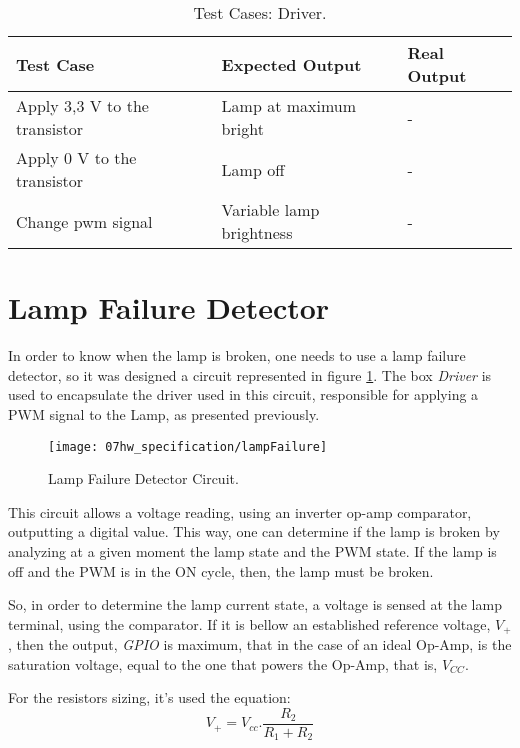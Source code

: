 \begin{table}[H]
	\centering
	\resizebox{\columnwidth}{!}
	{
		\begin{tabular}{|m{3cm}|m{5cm}||m{5cm}|}
			\hline
			\textbf{Test Case} & \textbf{Expected Output} & \textbf{Real Output}
			\\\hline\hline
			Apply 3,3 V to the transistor & Lamp at maximum bright & -
			\\\hline
			Apply 0 V to the transistor & Lamp off & -
			\\\hline
			Change \ac{pwm} signal & Variable lamp brightness & -
			\\\hline
		\end{tabular}
	}
	\caption{Test Cases: Driver.}
	\label{table:test_driver}
\end{table}

\section{Lamp Failure Detector}
In order to know when the lamp is broken, one needs to use a lamp failure detector, so it was designed a circuit represented in figure \ref{fig:lampFailure}. The box \textit{Driver} is used to encapsulate the driver used in this circuit, responsible for applying a PWM signal to the Lamp, as presented previously.

\begin{figure}[H]
	\centering
	\texttt{[image: 07hw\_specification/lampFailure]}
	\caption{Lamp Failure Detector Circuit.}
	\label{fig:lampFailure}
\end{figure}

This circuit allows a voltage reading, using an inverter \ac{op-amp} comparator, outputting a digital value. This way, one can determine if the lamp is broken by analyzing at a given moment the lamp state and the PWM state. If the lamp is off and the PWM is in the ON cycle, then, the lamp must be broken.

So, in order to determine the lamp current state, a voltage is sensed at the lamp terminal, using the comparator. If it is bellow an established reference voltage, $V_{+}$, then the output, \textit{GPIO} is maximum, that in the case of an ideal Op-Amp, is the saturation voltage, equal to the one that powers the Op-Amp, that is, $V_{CC}$.

For the resistors sizing, it's used the equation: \[V_{+} = V_{cc} . \dfrac{R_2}{R_1 + R_2} \]

